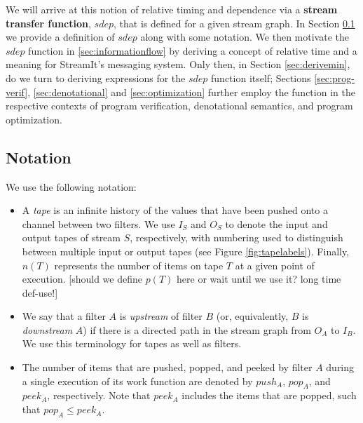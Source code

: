 We will arrive at this notion of relative timing and dependence via a
{\bf stream transfer function}, $sdep$, that is defined for a given
stream graph. In Section \ref{sec:notation} we provide a definition of
$sdep$ along with some notation.  We then motivate the $sdep$ function
in \ref{sec:informationflow} by deriving a concept of relative time
and a meaning for StreamIt's messaging system.  Only then, in Section
\ref{sec:derivemin}, do we turn to deriving expressions for the $sdep$
function itself; Sections \ref{sec:prog-verif}, \ref{sec:denotational}
and \ref{sec:optimization} further employ the function in the
respective contexts of program verification, denotational semantics,
and program optimization.

\subsection{Notation}
\label{sec:notation}

We use the following notation:

\begin{itemize}

\item A {\it tape} is an infinite history of the values that have been
  pushed onto a channel between two filters. We use $I_S$ and $O_S$ to
  denote the input and output tapes of stream $S$, respectively, with
  numbering used to distinguish between multiple input or output tapes
  (see Figure \ref{fig:tapelabels}).  Finally, $n(T)$ represents the
  number of items on tape $T$ at a given point of execution.  [should
  we define $p(T)$ here or wait until we use it?  long time def-use!]

\item We say that a filter $A$ is {\it upstream} of filter $B$ (or,
  equivalently, $B$ is {\it downstream} $A$) if there is a directed
  path in the stream graph from $O_A$ to $I_B$.  We use this
  terminology for tapes as well as filters.

\item The number of items that are pushed, popped, and peeked by
  filter $A$ during a single execution of its work function are
  denoted by $push_A$, $pop_A$, and $peek_A$, respectively.  Note that
  $peek_A$ includes the items that are popped, such that $pop_A \le
  peek_A$.

\end{itemize}

